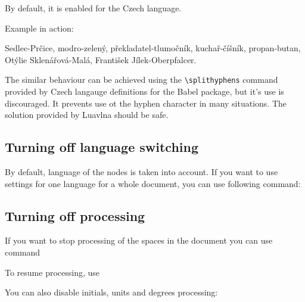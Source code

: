 \documentclass[12pt]{ltxdoc}
\newenvironment{mycode}{
	\medskip%
	\parindent=0pt%
}{\medskip}
\begin{document}
By default, it is enabled for the Czech language.

Example in action:

\begin{minipage}{3in}
   Sedlec-Prčice, modro-zelený,  překladatel-tlumočník, kuchař-číšník, propan-butan,                                                                                          
   Otýlie Sklenářová-Malá, František Jílek-Oberpfalcer.
\end{minipage}

The similar behaviour can be achieved using the \verb|\splithyphens|  command
provided by Czech langauge definitions for the Babel package, but it's use is
discouraged. It prevents use ot the hyphen character in many situations. The
solution provided by Luavlna should be safe.


\subsection{Turning off language switching}

By default, language of the nodes is taken into account. If you want to use
settings for one language for a whole document, you can use following command:

\begin{mycode}
\cmd{\preventsinglelang}
\end{mycode}

\subsection{Turning off processing}

If you want to stop processing of the spaces in the document you can use command

\begin{mycode}
\cmd{\preventsingleoff}
\end{mycode}

To resume processing, use

\begin{mycode}
\cmd{\preventsingleon}
\end{mycode}

You can also disable initials, units and degrees processing:

\begin{mycode}
  \cmd{\noinitials}\\
  \cmd{\nounits}\\
  \cmd{\nopredegrees}\\
  \cmd{\nosufdegrees}
\end{mycode}
\end{document}
